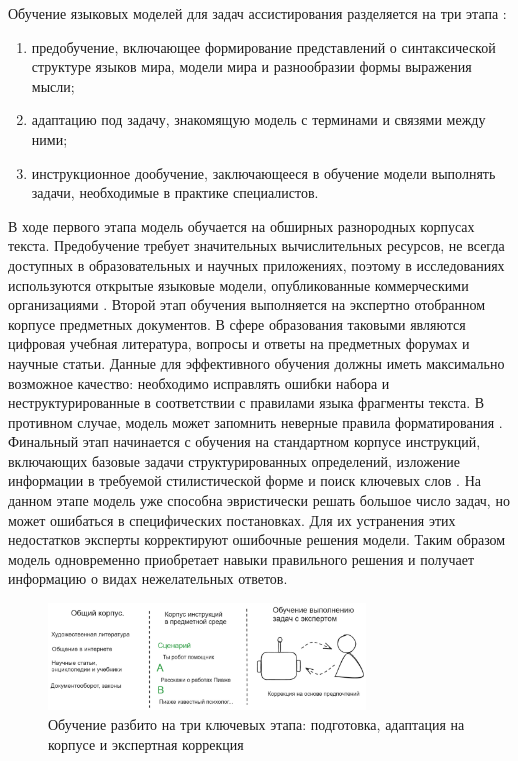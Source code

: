Обучение языковых моделей для задач ассистирования разделяется на три этапа \cite{ouyang2022training}: \begin{enumerate}
    \item предобучение, включающее формирование представлений о синтаксической структуре языков мира, модели мира и 
    разнообразии формы выражения мысли;
    \item адаптацию под задачу, знакомящую модель с терминами и связями между ними;
    \item инструкционное дообучение, заключающееся в обучение модели выполнять задачи, необходимые в практике специалистов.
\end{enumerate}
В ходе первого этапа модель обучается на обширных разнородных корпусах текста. Предобучение требует значительных 
вычислительных ресурсов, не всегда доступных в образовательных и научных приложениях, поэтому в исследованиях используются
открытые языковые модели, опубликованные коммерческими организациями \cite{jiang2023mistral} \cite{jiang2024mixtral} \cite{touvron2023llama}.
Второй этап обучения выполняется на экспертно отобранном корпусе предметных документов. В сфере образования таковыми являются цифровая учебная
литература, вопросы и ответы на предметных форумах и научные статьи. Данные для эффективного обучения должны 
иметь максимально возможное качество: необходимо исправлять ошибки набора и неструктурированные в соответствии с правилами
языка фрагменты текста. В противном случае, модель может запомнить неверные правила форматирования \cite{zhao2023survey}.
Финальный этап начинается с обучения на стандартном корпусе инструкций, включающих базовые задачи  структурированных определений, изложение информации в требуемой
стилистической форме и поиск ключевых слов \cite{zhang2023instruction}. На данном этапе модель уже способна эвристически решать 
большое число задач, но может ошибаться в специфических постановках. Для их устранения этих недостатков 
эксперты корректируют ошибочные решения модели. Таким образом модель одновременно приобретает навыки правильного решения
и получает информацию о видах нежелательных ответов. 

\begin{figure}[h]
    \centering
    \includegraphics[width=0.75\textwidth]{assets/work/arch/learning.excalidraw.png}
    \caption{Обучение разбито на три ключевых этапа: подготовка, адаптация на корпусе и экспертная коррекция}
    \label{train}
\end{figure}

